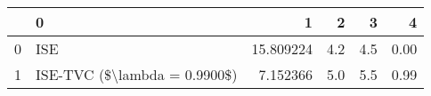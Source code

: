\begin{tabular}{llrrrr}
\toprule
{} &                             0 &          1 &    2 &    3 &     4 \\
\midrule
0 &                           ISE &  15.809224 &  4.2 &  4.5 &  0.00 \\
1 &  ISE-TVC (\$\textbackslash lambda = 0.9900\$) &   7.152366 &  5.0 &  5.5 &  0.99 \\
\bottomrule
\end{tabular}
